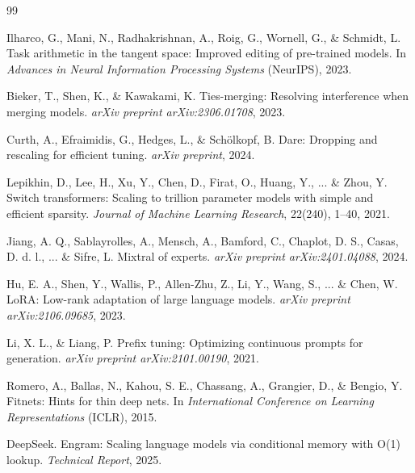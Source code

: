 \documentclass[11pt,a4paper]{article}
\begin{document}
\begin{thebibliography}{99}

Ilharco, G., Mani, N., Radhakrishnan, A., Roig, G., Wornell, G., \& Schmidt, L.
Task arithmetic in the tangent space: Improved editing of pre-trained models.
In \textit{Advances in Neural Information Processing Systems} (NeurIPS), 2023.

Bieker, T., Shen, K., \& Kawakami, K.
Ties-merging: Resolving interference when merging models.
\textit{arXiv preprint arXiv:2306.01708}, 2023.

Curth, A., Efraimidis, G., Hedges, L., \& Sch{\"o}lkopf, B.
Dare: Dropping and rescaling for efficient tuning.
\textit{arXiv preprint}, 2024.

Lepikhin, D., Lee, H., Xu, Y., Chen, D., Firat, O., Huang, Y., ... \& Zhou, Y.
Switch transformers: Scaling to trillion parameter models with simple and efficient sparsity.
\textit{Journal of Machine Learning Research}, 22(240), 1--40, 2021.

Jiang, A. Q., Sablayrolles, A., Mensch, A., Bamford, C., Chaplot, D. S., Casas, D. d. l., ... \& Sifre, L.
Mixtral of experts.
\textit{arXiv preprint arXiv:2401.04088}, 2024.

Hu, E. A., Shen, Y., Wallis, P., Allen-Zhu, Z., Li, Y., Wang, S., ... \& Chen, W.
LoRA: Low-rank adaptation of large language models.
\textit{arXiv preprint arXiv:2106.09685}, 2023.

Li, X. L., \& Liang, P.
Prefix tuning: Optimizing continuous prompts for generation.
\textit{arXiv preprint arXiv:2101.00190}, 2021.

Romero, A., Ballas, N., Kahou, S. E., Chassang, A., Grangier, D., \& Bengio, Y.
Fitnets: Hints for thin deep nets.
In \textit{International Conference on Learning Representations} (ICLR), 2015.

DeepSeek.
Engram: Scaling language models via conditional memory with O(1) lookup.
\textit{Technical Report}, 2025.

\end{thebibliography}
\end{document}
